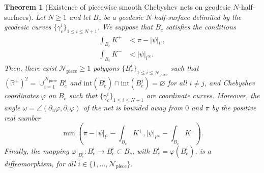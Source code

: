 \documentclass{article}
\newcommand{\R}{\mathbb{R}}
\newcommand{\DU}{\partial_{u}}
\newcommand{\DV}{\partial_{v}}
\newcommand{\halfP}{B}
\newcommand{\psim}{|\psi|_{l^\infty}}
\newcommand{\psitot}{|\psi|_{l^1}}
\newcommand{\Npiece}{\mathcal{N}_{\mathrm{piece}}}
\newtheorem{theorem}{Theorem}
\theoremstyle{remark}
\theoremstyle{prpart}
\begin{document}
\begin{theorem}[Existence of piecewise smooth Chebyshev nets on geodesic $N$-half-surfaces] \label{thm:cheb-half-surface-smooth3}
  Let $N\geq 1$ and let $\halfP_c$ be a geodesic $N$-half-surface delimited by the geodesic curves $\{\gamma_c^i\}_{1\leq i\leq N+1}$. We suppose that $\halfP_c$ satisfies the conditions   
\begin{align*} 
      \int_{\halfP_c} K^+ &< \pi-\psitot,\\
      \int_{\halfP_c} K^- &<  \psim.
\end{align*}
  Then, there exist $\Npiece\geq 1$ polygons $\{\halfP^i_e\}_{1\leq i\leq \Npiece}$ such that $(\R^+)^2 = \cup_{i=1}^{\Npiece}\halfP^i_e$ and $\text{int}(\halfP_e^i)\cap\text{int}(\halfP_e^j)=\varnothing$ for all $i\neq j$, and Chebyshev coordinates $\varphi$ on $\halfP_c$ such that $\{\gamma^i_c\}_{1\leq i\leq N+1}$ are coordinate curves. Moreover, the angle $\omega = \angle(\DU \varphi,\DV \varphi)$ of the net is bounded away from $0$ and $\pi$ by the positive real number
  \begin{equation*}
    \min\left(\pi-\psitot-\int_{\halfP_c} K^+,|\psi|_{l^\infty}-\int_{\halfP_c} K^-\right).
  \end{equation*}
  Finally, the mapping $\varphi\big|_{\halfP^i_e}:\halfP^i_e\to\halfP^i_c\subset\halfP_c$, with $\halfP^i_c = \varphi(\halfP^i_e)$, is a diffeomorphism, for all $i\in\{1,...,\Npiece\}$.
\end{theorem}

 


\end{document}
